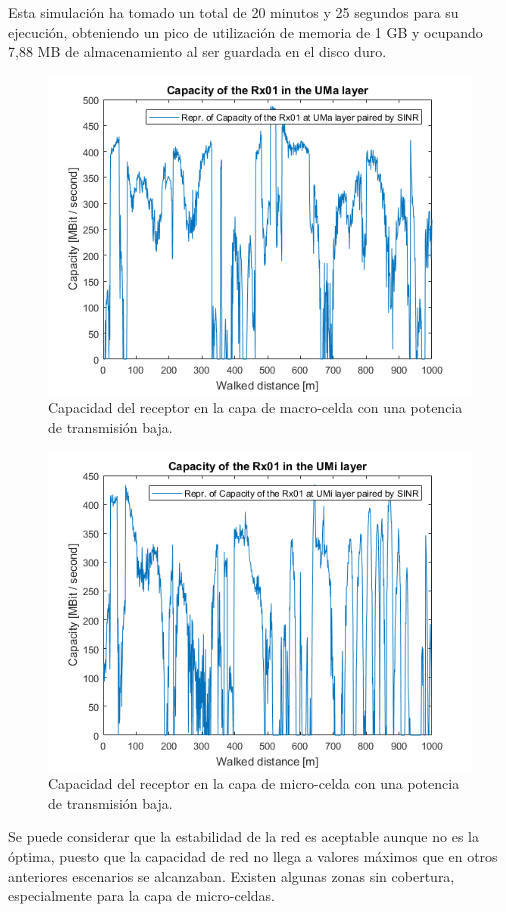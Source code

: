 Esta simulación ha tomado un total de 20 minutos y 25 segundos para su ejecución, obteniendo un pico de utilización de memoria de 1 GB y ocupando 7,88 MB de almacenamiento al ser guardada en el disco duro.

\begin{figure}[h!]
	\centering
    \includegraphics[width=0.8\linewidth]{imagenes/6_4_capacidad_uma_minimo.png}
	\caption{Capacidad del receptor en la capa de macro-celda con una potencia de transmisión baja.}
	\label{fig:simulacion_pot_min_uma}
\end{figure}

\begin{figure}[h!]
	\centering
    \includegraphics[width=0.8\linewidth]{imagenes/6_4_capacidad_umi_minimo.png}
	\caption{Capacidad del receptor en la capa de micro-celda con una potencia de transmisión baja.}
	\label{fig:simulacion_pot_min_umi}
\end{figure}

Se puede considerar que la estabilidad de la red es aceptable aunque no es la óptima, puesto que la capacidad de red no llega a valores máximos que en otros anteriores escenarios se alcanzaban. Existen algunas zonas sin cobertura, especialmente para la capa de micro-celdas.

